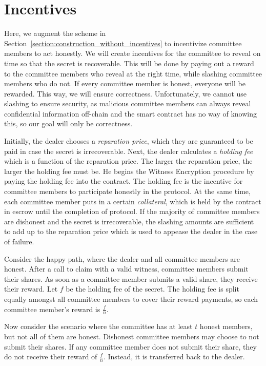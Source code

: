 \section{Incentives}\label{section:construction_incentives}
Here, we augment the scheme in Section~\ref{section:construction_without_incentives} to incentivize committee members to act honestly.
We will create incentives for the committee to reveal on time so that the secret is recoverable.
This will be done by paying out a reward to the committee members who reveal at the right time, while slashing committee members who do not.
If every committee member is honest, everyone will be rewarded.
This way, we will ensure correctness.
Unfortunately, we cannot use slashing to ensure security, as malicious committee members can always reveal confidential information off-chain and the smart contract has no way of knowing this, so our goal will only be correctness.

Initially, the dealer chooses a \emph{reparation price}, which they are guaranteed to be paid in case the secret is irrecoverable.
Next, the dealer calculates a \emph{holding fee} which is a function of the reparation price.
The larger the reparation price, the larger the holding fee must be. 
He begins the Witness Encryption procedure by paying the holding fee into the contract.
The holding fee is the incentive for committee members to participate honestly in the protocol.
At the same time, each committee member puts in a certain \emph{collateral}, which is held by the contract in escrow until the completion of protocol.
If the majority of committee members are dishonest and the secret is irrecoverable, the slashing amounts are sufficient to add up to the reparation price which is used to appease the dealer in the case of failure.

Consider the happy path, where the dealer and all committee members are honest.
After a call to \textsf{claim} with a valid witness, committee members submit their shares.
As soon as a committee member submits a valid share, they receive their reward.
Let $f$ be the holding fee of the secret.
The holding fee is split equally amongst all committee members to cover their reward payments, so each committee member's reward is $\frac{f}{n}$.

Now consider the scenario where the committee has at least $t$ honest members, but not all of them are honest.
Dishonest committee members may choose to not submit their shares.
If any committee member does not submit their share, they do not receive their reward of $\frac{f}{n}$.
Instead, it is transferred back to the dealer.

